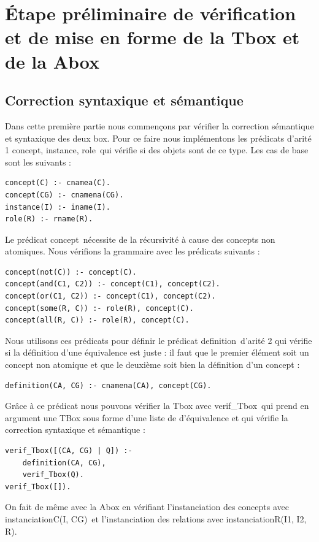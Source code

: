 \documentclass{article}
\begin{document}
\section{\'Etape préliminaire de vérification et de mise en forme de la Tbox et de la Abox}
\subsection{Correction syntaxique et sémantique}
Dans cette première partie nous commençons par vérifier la correction sémantique et syntaxique des deux box. Pour ce faire nous implémentons les prédicats d'arité 1 \color{blue}concept, instance, role\color{black}\ qui vérifie si des objets sont de ce type. Les cas de base sont les suivants :

\begin{verbatim}
concept(C) :- cnamea(C).
concept(CG) :- cnamena(CG). 
instance(I) :- iname(I).
role(R) :- rname(R). 
\end{verbatim}

Le prédicat \color{blue}concept\color{black}\ nécessite de la récursivité à cause des concepts non atomiques. Nous vérifions la grammaire avec les prédicats suivants :

\begin{verbatim}
concept(not(C)) :- concept(C).
concept(and(C1, C2)) :- concept(C1), concept(C2).
concept(or(C1, C2)) :- concept(C1), concept(C2).
concept(some(R, C)) :- role(R), concept(C).
concept(all(R, C)) :- role(R), concept(C).
\end{verbatim}

Nous utilisons ces prédicats pour définir le prédicat \color{blue}definition\color{black}\ d'arité 2 qui vérifie si la définition d'une équivalence est juste : il faut que le premier élément soit un concept non atomique et que le deuxième soit bien la définition d'un concept :
\begin{verbatim}
definition(CA, CG) :- cnamena(CA), concept(CG).
\end{verbatim}

Grâce à ce prédicat nous pouvons vérifier la Tbox avec \color{blue}verif\_Tbox\color{black}\ qui prend en argument une TBox sous forme d'une liste de d'équivalence et qui vérifie la correction syntaxique et sémantique : 
\begin{verbatim}
verif_Tbox([(CA, CG) | Q]) :- 
    definition(CA, CG), 
    verif_Tbox(Q).
verif_Tbox([]).
\end{verbatim}
On fait de même avec la Abox en vérifiant l'instanciation des concepts avec \color{blue}instanciationC(I, CG)\color{black}\ et l'instanciation des relations avec \color{blue}instanciationR(I1, I2, R)\color{black}.
\end{document}

